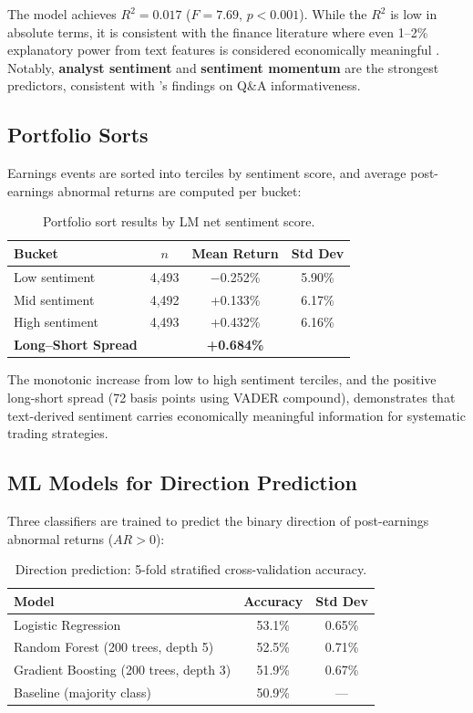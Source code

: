\documentclass[12pt,a4paper]{article}
\begin{document}
The model achieves $R^2 = 0.017$ ($F = 7.69$, $p < 0.001$). While the $R^2$ is low in absolute terms, it is consistent with the finance literature where even 1--2\% explanatory power from text features is considered economically meaningful \citep{chen2018sentimental}. Notably, \textbf{analyst sentiment} and \textbf{sentiment momentum} are the strongest predictors, consistent with \citeauthor{price2012earnings}'s findings on Q\&A informativeness.

\subsection{Portfolio Sorts}

Earnings events are sorted into terciles by sentiment score, and average post-earnings abnormal returns are computed per bucket:

\begin{table}[H]
\centering
\caption{Portfolio sort results by LM net sentiment score.}
\label{tab:portfolio-sort}
\begin{tabular}{@{}lccc@{}}
\toprule
\textbf{Bucket} & \textbf{$n$} & \textbf{Mean Return} & \textbf{Std Dev} \\
\midrule
Low sentiment & 4,493 & $-$0.252\% & 5.90\% \\
Mid sentiment & 4,492 & +0.133\% & 6.17\% \\
High sentiment & 4,493 & +0.432\% & 6.16\% \\
\midrule
\textbf{Long--Short Spread} & & \textbf{+0.684\%} & \\
\bottomrule
\end{tabular}
\end{table}

The monotonic increase from low to high sentiment terciles, and the positive long-short spread (72 basis points using VADER compound), demonstrates that text-derived sentiment carries economically meaningful information for systematic trading strategies.

\subsection{ML Models for Direction Prediction}

Three classifiers are trained to predict the binary direction of post-earnings abnormal returns ($AR > 0$):

\begin{table}[H]
\centering
\caption{Direction prediction: 5-fold stratified cross-validation accuracy.}
\label{tab:ml-accuracy}
\begin{tabular}{@{}lcc@{}}
\toprule
\textbf{Model} & \textbf{Accuracy} & \textbf{Std Dev} \\
\midrule
Logistic Regression & 53.1\% & 0.65\% \\
Random Forest (200 trees, depth 5) & 52.5\% & 0.71\% \\
Gradient Boosting (200 trees, depth 3) & 51.9\% & 0.67\% \\
\midrule
Baseline (majority class) & 50.9\% & --- \\
\bottomrule
\end{tabular}
\end{table}
\end{document}
